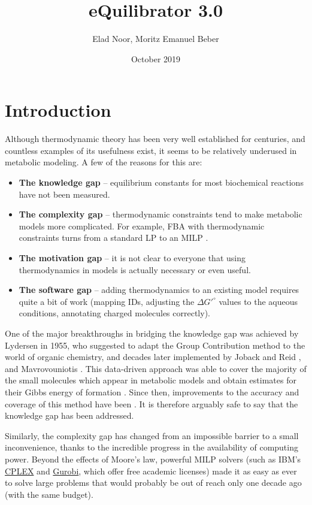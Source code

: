 \documentclass[twocolumn]{article}
\title{eQuilibrator 3.0}
\author{Elad Noor, Moritz Emanuel Beber}
\date{October 2019}
\begin{document}
\maketitle

\section{Introduction}
Although thermodynamic theory has been very well established for centuries, and countless examples of its usefulness exist, it seems to be relatively underused in metabolic modeling. A few of the reasons for this are:
\begin{itemize}
    \item \textbf{The knowledge gap} -- equilibrium constants for most biochemical reactions have not been measured.
    \item \textbf{The complexity gap} -- thermodynamic constraints tend to make metabolic models more complicated. For example, FBA with thermodynamic constraints turns from a standard LP to an MILP \cite{henry_thermodynamics-based_2007}.
    \item \textbf{The motivation gap} -- it is not clear to everyone that using thermodynamics in models is actually necessary or even useful.
    \item \textbf{The software gap} -- adding thermodynamics to an existing model requires quite a bit of work (mapping IDs, adjusting the $\Delta G'^\circ$ values to the aqueous conditions, annotating charged molecules correctly).
\end{itemize}

One of the major breakthroughs in bridging the knowledge gap was achieved by Lydersen in 1955, who suggested to adapt the Group Contribution method to the world of organic chemistry, and decades later implemented by Joback and Reid \cite{joback_estimation_1987}, and Mavrovouniotis \cite{mavrovouniotis_group_1988, mavrovouniotis_group_1990}. This data-driven approach was able to cover the majority of the small molecules which appear in metabolic models and obtain estimates for their Gibbs energy of formation \cite{feist_genomescale_2007}. Since then, improvements to the accuracy and coverage of this method have been  \cite{jankowski_group_2008, noor_integrated_2012, noor_consistent_2013, du_temperature-dependent_2018}. It is therefore arguably safe to say that the knowledge gap has been addressed.

Similarly, the complexity gap has changed from an impossible barrier to a small inconvenience, thanks to the incredible progress in the availability of computing power. Beyond the effects of Moore's law, powerful MILP solvers (such as IBM's \href{https://www.ibm.com/products/ilog-cplex-optimization-studio}{CPLEX} and \href{https://www.gurobi.com/}{Gurobi}, which offer free academic licenses) made it as easy as ever to solve large problems that would probably be out of reach only one decade ago (with the same budget).
\end{document}

